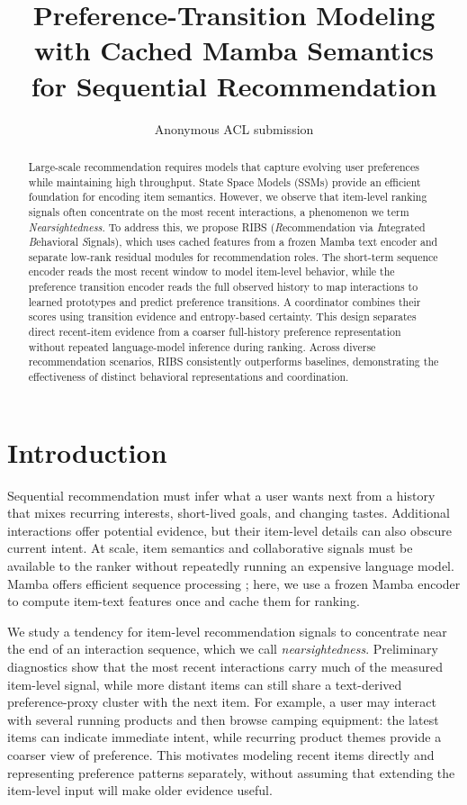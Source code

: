 \documentclass[11pt]{article}
\title{Preference-Transition Modeling with Cached Mamba Semantics\\for Sequential Recommendation}
\author{Anonymous ACL submission}
\begin{document}
\maketitle

\begin{abstract}
  Large-scale recommendation requires models that capture evolving user preferences while maintaining high throughput. State Space Models (SSMs) provide an efficient foundation for encoding item semantics. However, we observe that item-level ranking signals often concentrate on the most recent interactions, a phenomenon we term \emph{Nearsightedness}. To address this, we propose RIBS (\emph{R}ecommendation via \emph{I}ntegrated \emph{B}ehavioral \emph{S}ignals), which uses cached features from a frozen Mamba text encoder and separate low-rank residual modules for recommendation roles. The short-term sequence encoder reads the most recent window to model item-level behavior, while the preference transition encoder reads the full observed history to map interactions to learned prototypes and predict preference transitions. A coordinator combines their scores using transition evidence and entropy-based certainty. This design separates direct recent-item evidence from a coarser full-history preference representation without repeated language-model inference during ranking. Across diverse recommendation scenarios, RIBS consistently outperforms baselines, demonstrating the effectiveness of distinct behavioral representations and coordination.
\end{abstract}

\section{Introduction}
Sequential recommendation must infer what a user wants next from a history that mixes recurring interests, short-lived goals, and changing tastes. Additional interactions offer potential evidence, but their item-level details can also obscure current intent. At scale, item semantics and collaborative signals must be available to the ranker without repeatedly running an expensive language model. Mamba offers efficient sequence processing \citep{Mamba}; here, we use a frozen Mamba encoder to compute item-text features once and cache them for ranking.

We study a tendency for item-level recommendation signals to concentrate near the end of an interaction sequence, which we call \emph{nearsightedness}. Preliminary diagnostics show that the most recent interactions carry much of the measured item-level signal, while more distant items can still share a text-derived preference-proxy cluster with the next item. For example, a user may interact with several running products and then browse camping equipment: the latest items can indicate immediate intent, while recurring product themes provide a coarser view of preference. This motivates modeling recent items directly and representing preference patterns separately, without assuming that extending the item-level input will make older evidence useful.
\end{document}
